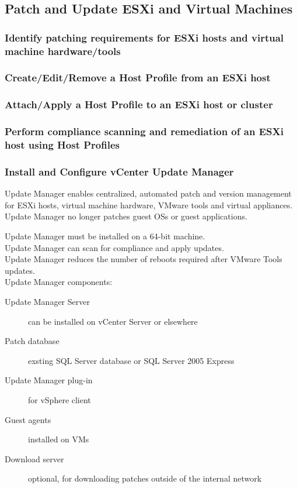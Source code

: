 \subsection{Patch and Update ESXi and Virtual Machines}

\subsubsection{Identify patching requirements for ESXi hosts and virtual machine hardware/tools}

\subsubsection{Create/Edit/Remove a Host Profile from an ESXi host}

\subsubsection{Attach/Apply a Host Profile to an ESXi host or cluster}

\subsubsection{Perform compliance scanning and remediation of an ESXi host using Host Profiles}

\subsubsection{Install and Configure vCenter Update Manager}

Update Manager enables centralized, automated patch and version management
for ESXi hosts, virtual machine hardware, VMware tools and virtual
appliances. Update Manager no longer patches guest OSs or guest applications.

Update Manager must be installed on a 64-bit machine.\\

Update Manager can scan for compliance and apply updates.\\

Update Manager reduces the number of reboots required after VMware Tools
updates.\\

Update Manager components:

\begin{description}

\item[Update Manager Server]
can be installed on vCenter Server or elsewhere

\item[Patch database]
exsting SQL Server database or SQL Server 2005 Express

\item[Update Manager plug-in]
for vSphere client

\item[Guest agents]
installed on VMs

\item[Download server]
optional, for downloading patches outside of the internal network

\end{description}

